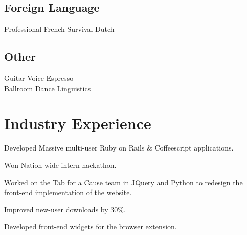 \documentclass[]{deedy-resume-openfont}
\begin{document}
\begin{minipage}[t]{0.33\textwidth}
\subsection{Foreign Language}
Professional French \textbullet{} Survival Dutch
\sectionsep

\subsection{Other}
Guitar \textbullet{} Voice \textbullet{} Espresso \\
Ballroom Dance \textbullet{} Linguistics


%
%

\end{minipage} 
\hfill
\begin{minipage}[t]{0.66\textwidth} 


\section{Industry Experience}

\vspace{\topsep} %
\begin{tightemize}
  \item Developed Massive multi-user Ruby on Rails \& Coffeescript applications.
  \item Won Nation-wide intern hackathon.
\end{tightemize}
\sectionsep

\begin{tightemize}
\item Worked on the Tab for a Cause team in JQuery and Python to redesign the front-end implementation of the website.
\item Improved new-user downloads by 30\%.
\item Developed front-end widgets for the browser extension.\end{tightemize}
\sectionsep



\end{minipage}
\end{document}
